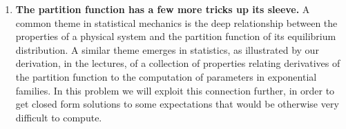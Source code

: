 \documentclass[11pt]{report}
\newcommand{\Ec}{\mathcal{E}}
\begin{document}
\begin{enumerate}[1.]
          \color{blue}
          Since $X_{1:n}$ are iid, the joint distribution is
          \begin{align*}
              f(x_1, \dots, x_n; \vec \lambda) & = \prod_{k=1}^n f(x_k; \vec \lambda)                                                                         \\
                                               & = \prod_{k=1}^n \frac{1}{Z(\vec \lambda)} p(x_k) e^{\vec \lambda \cdot \Ec(x_k)}                             \\
                                               & = \frac{1}{Z(\vec \lambda)^n} \left(\prod_{k=1}^n p(x_k)\right) e^{\vec \lambda \cdot \sum_{k=1}^n \Ec(x_k)} \\
          \end{align*}

          If we define $\tilde Z(\vec \lambda) = Z(\vec \lambda)^n$, $\tilde p(x_1, \dots, x_n) = \prod_{k=1}^n p(x_k)$, and $\tilde \Ec(x_1, \dots, x_n) = \sum_{k=1}^n \Ec(x_k)$, then we have
          \[f(\vec x; \vec \lambda) = \frac{1}{\tilde Z(\vec \lambda)} \tilde h(\vec x) e^{\vec \lambda \cdot \tilde \Ec(\vec x)} \]
          where each $\tilde \Ec_{1:c} = \sum_{k=1}^n \Ec_{1:c}(x_k) = n \bar{\Ec}$.
          \color{black}

          \pagebreak

    \item {\bf The partition function has a few more tricks up its sleeve.}
          A common theme in statistical mechanics is the deep relationship between the properties of a physical system and the partition function of its equilibrium distribution. A similar theme emerges in
          statistics, as illustrated by our derivation, in the lectures, of a collection of properties relating
          derivatives of the partition function to the computation of parameters in exponential families. In this problem we will exploit this connection further, in order to get closed form solutions to some expectations that would be otherwise very difficult to compute.


\end{enumerate}
\end{document}
